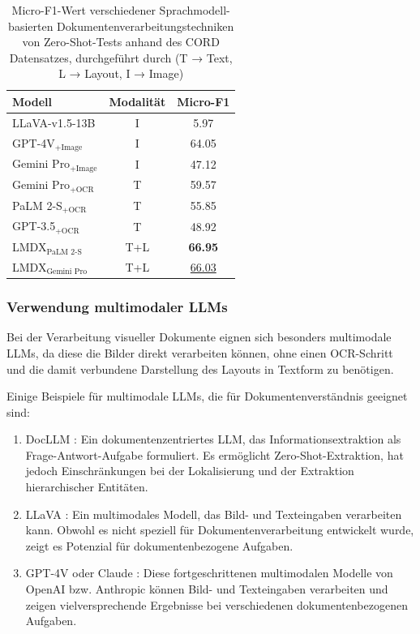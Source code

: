 \begin{table}
	\centering
	\begin{tabular}{lcc}
		\hline
		Modell & Modalität & Micro-F1 \\
		\hline
		LLaVA-v1.5-13B & I & 5.97 \\
		GPT-4V$_\text{+Image}$ & I & 64.05 \\
		Gemini Pro$_\text{+Image}$ & I & 47.12 \\
		Gemini Pro$_\text{+OCR}$ & T & 59.57 \\
		PaLM 2-S$_\text{+OCR}$ & T & 55.85 \\
		GPT-3.5$_\text{+OCR}$ & T & 48.92 \\
		LMDX$_\text{PaLM 2-S}$ & T+L & \textbf{66.95} \\
		LMDX$_\text{Gemini Pro}$ & T+L & \underline{66.03} \\
		\hline
	\end{tabular}
	\caption{Micro-F1-Wert verschiedener Sprachmodell-basierten Dokumentenverarbeitungstechniken von Zero-Shot-Tests anhand des CORD \parencite{park2019cord} Datensatzes, durchgeführt durch \textcite{PerotVincent2024LLMD} (T → Text, L → Layout, I → Image)}
	\label{tab:lmdx_cord_zero_shot_results}
\end{table}

\subsubsection{Verwendung multimodaler \glspl{LLM}}
\label{subsec:verwendung-multimodaler-llms}

Bei der Verarbeitung visueller Dokumente eignen sich besonders multimodale \glspl{LLM}, da diese die Bilder direkt verarbeiten können, ohne einen \gls{OCR}-Schritt und die damit verbundene Darstellung des Layouts in Textform zu benötigen.

Einige Beispiele für multimodale \glspl{LLM}, die für Dokumentenverständnis geeignet sind:

\begin{enumerate}
	\item DocLLM \parencite{WangDongsheng2023DAlg}: Ein dokumentenzentriertes \gls{LLM}, das Informationsextraktion als Frage-Antwort-Aufgabe formuliert. Es ermöglicht Zero-Shot-Extraktion, hat jedoch Einschränkungen bei der Lokalisierung und der Extraktion hierarchischer Entitäten.
	\item LLaVA \parencite{CaffagniDavide2024WHRG}: Ein multimodales Modell, das Bild- und Texteingaben verarbeiten kann. Obwohl es nicht speziell für Dokumentenverarbeitung entwickelt wurde, zeigt es Potenzial für dokumentenbezogene Aufgaben.
	\item GPT-4V \parencite{openai_chatgpt} oder Claude \parencite{anthropic_claude}: Diese fortgeschrittenen multimodalen Modelle von OpenAI bzw. Anthropic können Bild- und Texteingaben verarbeiten und zeigen vielversprechende Ergebnisse bei verschiedenen dokumentenbezogenen Aufgaben.
\end{enumerate}

